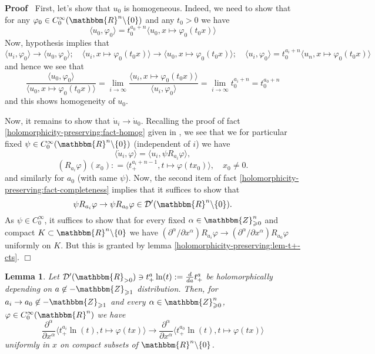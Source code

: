 \documentclass{article}
\newcommand{\assign}{:=}
\newcommand{\nin}{\not\in}
\renewenvironment{proof}{\noindent\textbf{Proof\ }}{\hspace*{\fill}$\Box$\medskip}
\newtheorem{lemma}[proposition]{Lemma}
\theoremstyle{remark}
\begin{document}
\begin{proof}
  First, let's show that $u_0$ is homogeneous. Indeed, we need to show that
  for any $\varphi_0 \in C_0^{\infty} (\mathbbm{R}^n \backslash \{ 0 \})$ and
  any $t_0 > 0$ we have
  \[ \langle u_0, \varphi_0 \rangle = t_0^{a_0 + n} \langle u_0, x \mapsto
     \varphi_0 (t_0 x) \rangle \]
  Now, hypothesis implies that
  \[ \langle u_i, \varphi_0 \rangle \rightarrow \langle u_0, \varphi_0 \rangle
     ; \quad \langle u_i, x \mapsto \varphi_0 (t_0 x) \rangle \rightarrow
     \langle u_0, x \mapsto \varphi_0 (t_0 x) \rangle ; \quad \langle u_i,
     \varphi_0 \rangle = t_0^{a_i + n} \langle u_n, x \mapsto \varphi_0 (t_0
     x) \rangle \]
  and hence we see that
  \[ \frac{\langle u_0, \varphi_0 \rangle}{\langle u_0, x \mapsto \varphi_0
     (t_0 x) \rangle} = \lim_{i \rightarrow \infty} \frac{\langle u_i, x
     \mapsto \varphi_0 (t_0 x) \rangle}{\langle u_i, \varphi_0 \rangle} =
     \lim_{i \rightarrow \infty} t_0^{a_i + n} = t_0^{a_0 + n} \]
  and this shows homogeneity of $u_0$.
  
  Now, it remains to show that $\dot{u}_i \rightarrow \dot{u}_0$. Recalling
  the proof of fact \ref{holomorphicity-preserving:fact-homog} given in
  {\cite{hormander1983analysis}}, we see that we for particular fixed $\psi
  \in C_0^{\infty} (\mathbbm{R}^n \backslash \{ 0 \})$ (independent of $i$) we
  have
  \[ \langle \dot{u}_i, \varphi \rangle = \langle u_i, \psi R_{a_i} \varphi
     \rangle, \]
  \[ (R_{a_i} \varphi) (x_0) : = \langle t_+^{a_i + n - 1}, t \mapsto \varphi
     (t x_0) \rangle, \quad x_0 \neq 0. \]
  and similarly for $a_0$ (with same $\psi$). Now, the second item of fact
  \ref{holomorphicity-preserving:fact-completeness} implies that it suffices
  to show that
  \[ \psi R_{a_i} \varphi \rightarrow \psi R_{a_0} \varphi \in \mathcal{D}'
     (\mathbbm{R}^n \backslash \{ 0 \}) . \]
  As $\psi \in C_0^{\infty}$, it suffices to show that for every fixed $\alpha
  \in \mathbbm{Z}_{\geqslant 0}^n$ and compact $K \subset \mathbbm{R}^n
  \backslash \{ 0 \}$ we have $(\partial^{\alpha} / \partial x^{\alpha})
  R_{a_i} \varphi \rightarrow (\partial^{\alpha} / \partial x^{\alpha})
  R_{a_0} \varphi$ uniformly on $K$. But this is granted by lemma
  \ref{holomorphicity-preserving:lem-t+-cts}.
\end{proof}

\begin{lemma}
  \label{holomorphicity-preserving:lem-t+ln-cts}Let $\mathcal{D}'
  (\mathbbm{R}_{> 0}) \ni t_+^a \ln (t) \assign \frac{d}{d a} t_+^a$ be
  holomorphically depending on $a \nin -\mathbbm{Z}_{\geqslant 1}$
  distribution. Then, for $a_i \rightarrow a_0 \nin -\mathbbm{Z}_{\geqslant
  1}$ and every $\alpha \in \mathbbm{Z}_{\geqslant 0}^n$, $\varphi \in
  C_0^{\infty} (\mathbbm{R}^n)$ we have
  \[ \frac{\partial^{\alpha}}{\partial x^{\alpha}} \langle t_+^{a_i} \ln (t),
     t \mapsto \varphi (t x) \rangle \rightarrow
     \frac{\partial^{\alpha}}{\partial x^{\alpha}} \langle t_+^{a_0} \ln (t),
     t \mapsto \varphi (t x) \rangle \]
  uniformly in $x$ on compact subsets of $\mathbbm{R}^n \backslash \{ 0 \}$.
\end{lemma}
\end{document}
